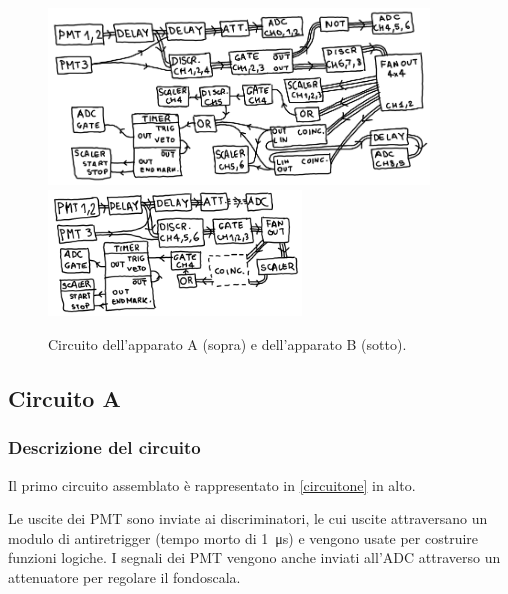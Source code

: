 \begin{figure}
	\centering
	\includegraphics[width=0.9\textwidth]{immagini/circuitone} \\
	\vspace{1em}
	\includegraphics[width=0.6\textwidth]{immagini/circuitob}
	\caption{Circuito dell'apparato A (sopra) e dell'apparato B (sotto).}
	\label{circuitone}
\end{figure}

\subsection{Circuito A}

\subsubsection{Descrizione del circuito}

Il primo circuito assemblato è rappresentato in \autoref{circuitone} in alto.

Le uscite dei PMT sono inviate ai discriminatori, le cui uscite attraversano un modulo di antiretrigger (tempo morto di \SI{1}{\micro s}) e vengono usate per costruire funzioni logiche. I segnali dei PMT vengono anche inviati all'ADC attraverso un attenuatore per regolare il fondoscala.

